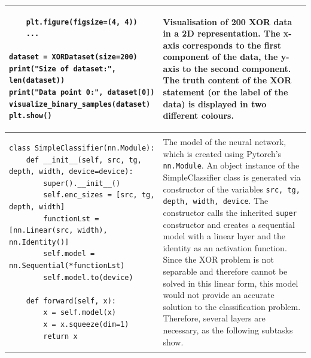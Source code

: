 \begin{longtable}{|m{}|m{}|}
\begin{lstlisting}
    plt.figure(figsize=(4, 4))
    ...

dataset = XORDataset(size=200)
print("Size of dataset:", len(dataset))
print("Data point 0:", dataset[0])
visualize_binary_samples(dataset)
plt.show()
\end{lstlisting} & Visualisation of 200 XOR data in a 2D representation. The x-axis corresponds to the first component of the data, the y-axis to the second component. The truth content of the XOR statement (or the label of the data) is displayed in two different colours. \\ \hline
\begin{lstlisting}
class SimpleClassifier(nn.Module):
    def __init__(self, src, tg, depth, width, device=device):
        super().__init__()
        self.enc_sizes = [src, tg, depth, width]
        functionLst = [nn.Linear(src, width), nn.Identity()]
        self.model = nn.Sequential(*functionLst)
        self.model.to(device)

    def forward(self, x):
        x = self.model(x)
        x = x.squeeze(dim=1)
        return x
\end{lstlisting} & The model of the neural network, which is created using Pytorch's \lstinline|nn.Module|. An object instance of the SimpleClassifier class is generated via constructor of the variables \lstinline|src, tg, depth, width, device|. The constructor calls the inherited \lstinline|super| constructor and creates a sequential model with a linear layer and the identity as an activation function. Since the XOR problem is not separable and therefore cannot be solved in this linear form, this model would not provide an accurate solution to the classification problem. Therefore, several layers are necessary, as the following subtasks show.


\end{longtable}
